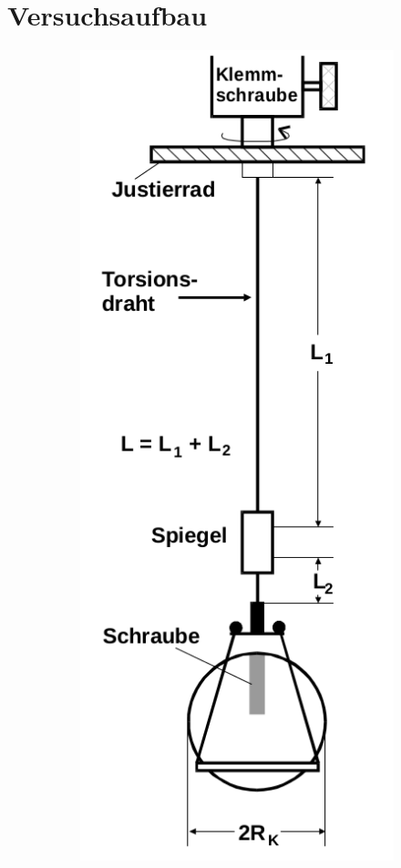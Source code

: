 \section{Versuchsaufbau}
\label{sec:Versuchsaufbau}

\begin{figure}
	\centering
	\begin{subfigure}[b]{0.3\textwidth}
		\includegraphics[width=\textwidth]{Bilder/aufbauallgemein.png}

\end{subfigure}
\end{figure}
